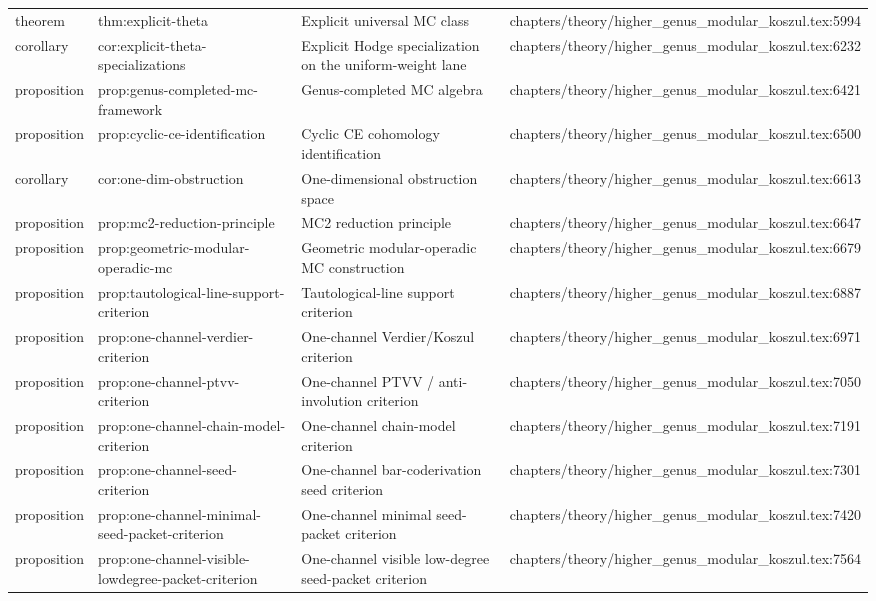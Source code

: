 \documentclass[11pt]{article}
\begin{document}
\begin{longtable}{L{0.10\textwidth}L{0.26\textwidth}L{0.42\textwidth}L{0.22\textwidth}}
theorem & thm:explicit-theta & Explicit universal MC class & chapters/theory/higher\_genus\_modular\_koszul.tex:5994\\
corollary & cor:explicit-theta-specializations & Explicit Hodge specialization on the uniform-weight lane & chapters/theory/higher\_genus\_modular\_koszul.tex:6232\\
proposition & prop:genus-completed-mc-framework & Genus-completed MC algebra & chapters/theory/higher\_genus\_modular\_koszul.tex:6421\\
proposition & prop:cyclic-ce-identification & Cyclic CE cohomology identification & chapters/theory/higher\_genus\_modular\_koszul.tex:6500\\
corollary & cor:one-dim-obstruction & One-dimensional obstruction space & chapters/theory/higher\_genus\_modular\_koszul.tex:6613\\
proposition & prop:mc2-reduction-principle & MC2 reduction principle & chapters/theory/higher\_genus\_modular\_koszul.tex:6647\\
proposition & prop:geometric-modular-operadic-mc & Geometric modular-operadic MC construction & chapters/theory/higher\_genus\_modular\_koszul.tex:6679\\
proposition & prop:tautological-line-support-criterion & Tautological-line support criterion & chapters/theory/higher\_genus\_modular\_koszul.tex:6887\\
proposition & prop:one-channel-verdier-criterion & One-channel Verdier/Koszul criterion & chapters/theory/higher\_genus\_modular\_koszul.tex:6971\\
proposition & prop:one-channel-ptvv-criterion & One-channel PTVV / anti-involution criterion & chapters/theory/higher\_genus\_modular\_koszul.tex:7050\\
proposition & prop:one-channel-chain-model-criterion & One-channel chain-model criterion & chapters/theory/higher\_genus\_modular\_koszul.tex:7191\\
proposition & prop:one-channel-seed-criterion & One-channel bar-coderivation seed criterion & chapters/theory/higher\_genus\_modular\_koszul.tex:7301\\
proposition & prop:one-channel-minimal-seed-packet-criterion & One-channel minimal seed-packet criterion & chapters/theory/higher\_genus\_modular\_koszul.tex:7420\\
proposition & prop:one-channel-visible-lowdegree-packet-criterion & One-channel visible low-degree seed-packet criterion & chapters/theory/higher\_genus\_modular\_koszul.tex:7564\\

\end{longtable}
\end{document}
